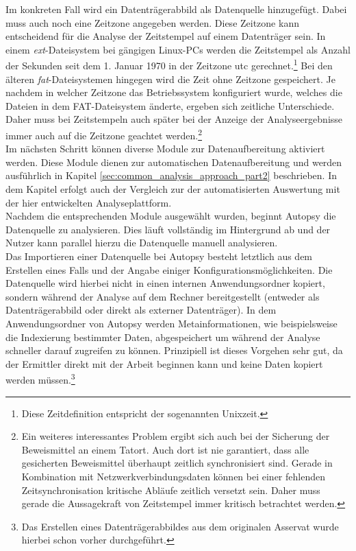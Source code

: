 \noindent
Im konkreten Fall wird ein Datenträgerabbild als Datenquelle hinzugefügt. Dabei muss auch noch eine Zeitzone angegeben werden. Diese Zeitzone kann entscheidend für die Analyse der Zeitstempel auf einem Datenträger sein. In einem \textit{ext}-Dateisystem bei gängigen Linux-PCs werden die Zeitstempel als Anzahl der Sekunden seit dem 1. Januar 1970 in der Zeitzone \acrshort{utc} gerechnet.\cite[S. 326]{filesystem_forensic}\footnote{Diese Zeitdefinition entspricht der sogenannten Unixzeit.} Bei den älteren \textit{\acrshort{fat}}-Dateisystemen hingegen wird die Zeit ohne Zeitzone gespeichert.\cite[S. 192-194]{filesystem_forensic} Je nachdem in welcher Zeitzone das Betriebssystem konfiguriert wurde, welches die Dateien in dem FAT-Dateisystem änderte, ergeben sich zeitliche Unterschiede. Daher muss bei Zeitstempeln auch später bei der Anzeige der Analyseergebnisse immer auch auf die Zeitzone geachtet werden.\footnote{Ein weiteres interessantes Problem ergibt sich auch bei der Sicherung der Beweismittel an einem Tatort. Auch dort ist nie garantiert, dass alle gesicherten Beweismittel überhaupt zeitlich synchronisiert sind. Gerade in Kombination mit Netzwerkverbindungsdaten können bei einer fehlenden Zeitsynchronisation kritische Abläufe zeitlich versetzt sein. Daher muss gerade die Aussagekraft von Zeitstempel immer kritisch betrachtet werden.}\\

\noindent
Im nächsten Schritt können diverse Module zur Datenaufbereitung aktiviert werden. Diese Module dienen zur automatischen Datenaufbereitung und werden ausführlich in Kapitel \ref{sec:common_analysis_approach_part2} beschrieben. In dem Kapitel erfolgt auch der Vergleich zur der automatisierten Auswertung mit der hier entwickelten Analyseplattform.\\
Nachdem die entsprechenden Module ausgewählt wurden, beginnt Autopsy die Datenquelle zu analysieren. Dies läuft vollständig im Hintergrund ab und der Nutzer kann parallel hierzu die Datenquelle manuell analysieren.\\ 

\noindent
Das Importieren einer Datenquelle bei Autopsy besteht letztlich aus dem Erstellen eines Falls und der Angabe einiger Konfigurationsmöglichkeiten. Die Datenquelle wird hierbei nicht in einen internen Anwendungsordner kopiert, sondern während der Analyse auf dem Rechner bereitgestellt (entweder als Datenträgerabbild oder direkt als externer Datenträger). 
In dem Anwendungsordner von Autopsy werden Metainformationen, wie beispielsweise die Indexierung bestimmter Daten, abgespeichert um während der Analyse schneller darauf zugreifen zu können. Prinzipiell ist dieses Vorgehen sehr gut, da der Ermittler direkt mit der Arbeit beginnen kann und keine Daten kopiert werden müssen.\footnote{Das Erstellen eines Datenträgerabbildes aus dem originalen Asservat wurde hierbei schon vorher durchgeführt.}

